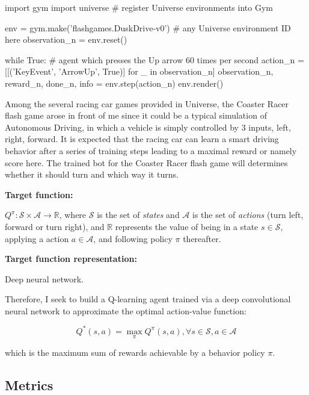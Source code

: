 \documentclass[a4paper]{article}
\begin{document}
\begin{python}
import gym
import universe # register Universe environments into Gym

env = gym.make('flashgames.DuskDrive-v0') # any Universe environment ID here
observation_n = env.reset()

while True:
  # agent which presses the Up arrow 60 times per second
  action_n = [[('KeyEvent', 'ArrowUp', True)] for _ in observation_n]
  observation_n, reward_n, done_n, info = env.step(action_n)
  env.render()
\end{python}

Among the several racing car games provided in Universe, the Coaster Racer flash game arose in front of me since it could be a typical simulation of Autonomous Driving, in which a vehicle is simply controlled by 3 inputs, left, right, forward. It is expected that the racing car can learn a smart driving behavior after a series of training steps leading to a maximal reward or namely score here. The trained bot for the Coaster Racer flash game will determines whether it should turn and which way it turns.

\textbf{Target function:}

$Q^\pi : \mathcal{S} \times \mathcal{A} \to \mathbb{R}$, where $\mathcal{S}$ is the set of \emph{states} and $\mathcal{A}$ is the set of \emph{actions} (turn left, forward or turn right), and $\mathbb{R}$ represents the value of being in a state $s \in \mathcal{S}$, applying a action $a \in \mathcal{A}$, and following policy $\pi$ thereafter.

\textbf{Target function representation:}

Deep neural network.

Therefore, I seek to build a Q-learning agent trained via a deep convolutional neural network to approximate the optimal action-value function:

\begin{equation}
Q^*(s,a) = \max\limits_\pi Q^\pi(s,a), \forall s \in \mathcal{S}, a \in \mathcal{A}
\end{equation}

\noindent which is the maximum sum of rewards achievable by a behavior policy $\pi$.

\subsection{Metrics}
\end{document}
